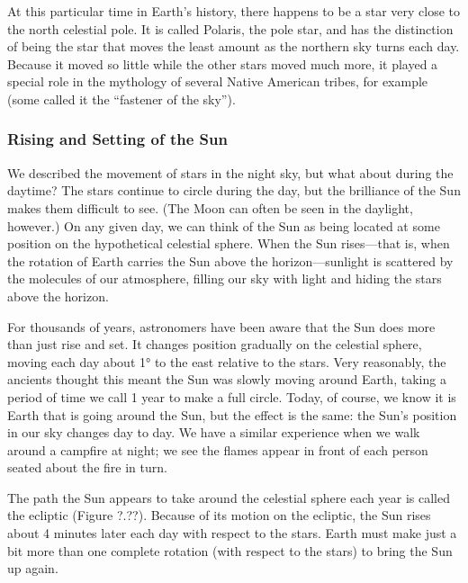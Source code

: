 \documentclass[main.tex]{subfiles}
\begin{document}
\vspace{1em}

At this particular time in Earth's history, there happens to be a star very close to the north celestial pole. It is called Polaris, the pole star, and has the distinction of being the star that moves the least amount as the northern sky turns each day. Because it moved so little while the other stars moved much more, it played a special role in the mythology of several Native American tribes, for example (some called it the ``fastener of the sky'').

\subsubsection*{Rising and Setting of the Sun}

We described the movement of stars in the night sky, but what about during the daytime? The stars continue to circle during the day, but the brilliance of the Sun makes them difficult to see. (The Moon can often be seen in the daylight, however.) On any given day, we can think of the Sun as being located at some position on the hypothetical celestial sphere. When the Sun rises---that is, when the rotation of Earth carries the Sun above the horizon---sunlight is scattered by the molecules of our atmosphere, filling our sky with light and hiding the stars above the horizon.

\vspace{1em}

For thousands of years, astronomers have been aware that the Sun does more than just rise and set. It changes position gradually on the celestial sphere, moving each day about \ang{1} to the east relative to the stars. Very reasonably, the ancients thought this meant the Sun was slowly moving around Earth, taking a period of time we call 1 \gls{year} to make a full circle. Today, of course, we know it is Earth that is going around the Sun, but the effect is the same: the Sun's position in our sky changes day to day. We have a similar experience when we walk around a campfire at night; we see the flames appear in front of each person seated about the fire in turn.

\vspace{1em}

The path the Sun appears to take around the celestial sphere each year is called the \gls{ecliptic} (Figure ?.??). Because of its motion on the ecliptic, the Sun rises about 4 minutes later each day with respect to the stars. Earth must make just a bit more than one complete rotation (with respect to the stars) to bring the Sun up again.
\end{document}
